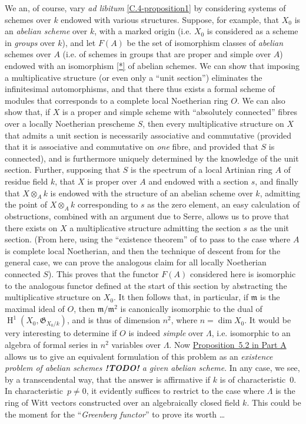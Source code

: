 \documentclass{article}
\theoremstyle{plain}
\theoremstyle{definition}
\newcommand{\fk}[1]{{\mathfrak{#1}}}
\DeclareMathOperator{\HH}{H}
\newcommand{\todo}{\textbf{ !TODO! }}
\newcommand{\oldpage}[1]{\marginpar{\footnotesize$\Big\vert$ \textit{p.~#1}}}
\begin{document}
We an, of course, vary \emph{ad libitum} \cref{C.4-proposition1} by considering systems of schemes over $k$ endowed with various structures.
Suppose, for example, that $X_0$ is an \emph{abelian scheme} over $k$, with a marked origin (i.e. $X_0$ is considered as a scheme in \emph{groups} over $k$), and let $F(A)$ be the set of isomorphism classes of \emph{abelian} schemes over $A$ (i.e. of schemes in groups that are proper and simple over $A$) endowed with an isomorphism \cref{*} of abelian schemes.
We can show that imposing a multiplicative structure (or even only a ``unit section'') eliminates the infinitesimal automorphisms, and that there thus exists a formal scheme of modules that corresponds to a complete local Noetherian ring $O$.
We can also show that, if $X$ is a proper and simple scheme with ``absolutely connected'' fibres over a locally Noetherian prescheme $S$, then every multiplicative structure on $X$ that admits a unit section is necessarily associative and commutative (provided that it is associative and commutative on \emph{one} fibre, and provided that $S$ is connected), and is furthermore uniquely determined by the knowledge
\oldpage{195-19}
of the unit section.
Further, supposing that $S$ is the spectrum of a local Artinian ring $A$ of residue field $k$, that $X$ is proper over $A$ and endowed with a section $s$, and finally that $X\otimes_A k$ is endowed with the structure of an abelian scheme over $k$, admitting the point of $X\otimes_A k$ corresponding to $s$ as the zero element, an easy calculation of obstructions, combined with an argument due to Serre, allows us to prove that there exists on $X$ a multiplicative structure admitting the section $s$ as the unit section.
(From here, using the ``existence theorem'' of \cite{2} to pass to the case where $A$ is complete local Noetherian, and then the technique of descent from \cite{3} for the general case, we can prove the analogous claim for all locally Noetherian connected $S$).
This proves that the functor $F(A)$ considered here is isomorphic to the analogous functor defined at the start of this section by abstracting the multiplicative structure on $X_0$.
It then follows that, in particular, if $\fk{m}$ is the maximal ideal of $O$, then $\fk{m}/\fk{m}^2$ is canonically isomorphic to the dual of $\HH^1(X_0,\fk{G}_{X_0/k})$, and is thus of dimension $n^2$, where $n=\dim X_0$.
It would be very interesting to determine if $O$ is indeed \emph{simple} over $\Lambda$, i.e. isomorphic to an algebra of formal series in $n^2$ variables over $\Lambda$.
Now \hyperref[A.5-proposition2]{Proposition~5.2 in Part A} allows us to give an equivalent formulation of this problem as an \emph{existence problem of abelian schemes \todo a given abelian scheme}.
In any case, we see, by a transcendental way, that the answer is affirmative if $k$ is of characteristic~$0$.
In characteristic~$p\neq0$, it evidently suffices to restrict to the case where $\Lambda$ is the ring of Witt vectors constructed over an algebraically closed field $k$.
This could be the moment for the ``\emph{Greenberg functor}'' to prove its worth \ldots
\end{document}
